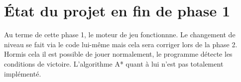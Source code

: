 \documentclass{article}
\begin{document}
	\section{État du projet en fin de phase 1}
Au terme de cette phase 1, le moteur de jeu fonctionnne. Le changement de niveau se fait via le code lui-même mais cela sera corriger lors de la phase 2. Hormis cela il est possible de jouer normalement, le programme détecte les conditions de victoire. L'algorithme A* quant à lui n'est pas totalement implémenté.



		

\newpage
\end{document}
